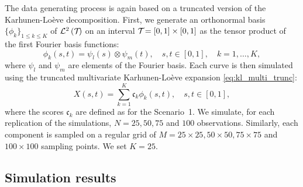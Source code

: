 \begin{scenario}
The data generating process is again based on a truncated version of the Karhunen-Loève decomposition. First, we generate an orthonormal basis $\{\phi_k\}_{1 \leq k \leq K}$ of $\mathcal{L}^{2}\left(\mathcal{T}_{}\right)$ on an interval $\mathcal{T}_{} = [0, 1] \times [0, 1]$ as the tensor product of the first Fourier basis functions:
\begin{equation}
    \phi_k(s, t) = \psi_l(s) \otimes \psi_m(t), \quad s, t \in [0, 1],\quad k = 1, \dots, K,
\end{equation}
where $\psi_l$ and $\psi_m$ are elements of the Fourier basis.
Each curve is then simulated using the truncated multivariate Karhunen-Loève expansion \eqref{eq:kl_multi_trunc}:
\begin{equation}
    X(s, t) = \sum_{k = 1}^K \mathfrak{c}_k \phi_k(s, t), \quad s, t \in [0, 1],
\end{equation}
where the scores $\mathfrak{c}_k$ are defined as for the Scenario~1. We simulate, for each replication of the simulations, $N = 25, 50, 75$ and $100$ observations. Similarly, each component is sampled on a regular grid of $M = 25 \times 25, 50 \times 50, 75 \times 75$ and $100 \times 100$ sampling points. We set $K = 25$.
\end{scenario}


\subsection{Simulation results} %
\label{sub:simulation_results}

